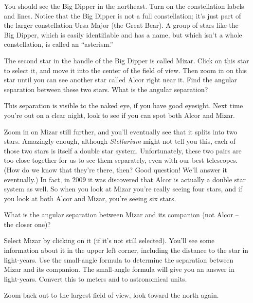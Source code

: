 You should see the Big Dipper in the northeast.
Turn
on the constellation labels and lines.  Notice that the Big
Dipper is not a full constellation; it's just part of the larger constellation
Ursa Major (the Great Bear).  A group of stars like the Big
Dipper, which is easily
identifiable and has a name, but which isn't a whole constellation,
is called an ``asterism.''  

The second star in the handle of the Big Dipper is called Mizar.
Click on this star to select it, and move it into the center
of the field of view. 
Then zoom in on this star until you can see
another star called Alcor right near it.  Find the angular separation
between these two stars.
What is the angular separation?

\answerspace{1in}

This separation is visible to the naked eye, if you have good eyesight.
Next time you're out on a clear night, look to see if you can spot both
Alcor and Mizar.

Zoom in on Mizar still further, and you'll eventually see that it
splits into two stars. Amazingly enough, although \textit{Stellarium}
might not tell you this, each of those two stars is itself a double
star system.
Unfortunately, these two pairs are too close together for us to 
see them separately, even with our best telescopes.  (How do we know
that they're there, then?  Good question! We'll answer it eventually.) 
In fact, in 2009 it was discovered that Alcor is actually a double
star system as well.
So when you look at Mizar you're really seeing four stars,
and if you look at both Alcor and Mizar, you're seeing six stars.

What is the angular separation between Mizar and its companion (not
Alcor -- the closer one)?

\answerspace{1in}

Select Mizar by clicking on it (if it's not still selected). 
You'll see some information about it in the upper left corner,
including the distance to the star in light-years. 
Use the small-angle formula to determine the separation between
Mizar and its companion.  The small-angle formula will give you
an answer in light-years.  Convert this to meters and to astronomical
units.


\answerspace{2in}

 
Zoom back out to the largest field of view, look toward the north again.

\bigskip


